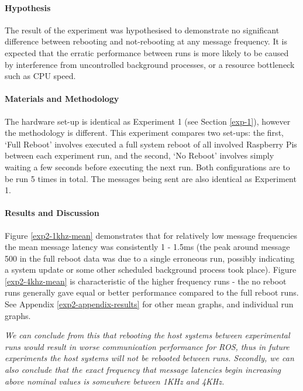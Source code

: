 \documentclass[../dissertation.tex]{subfiles}
\begin{document}
\paragraph{Hypothesis} The result of the experiment was hypothesised to demonstrate no significant difference between rebooting and not-rebooting at any message frequency. It is expected that the erratic performance between runs is more likely to be caused by interference from uncontrolled background processes, or a resource bottleneck such as CPU speed.

\paragraph{Materials and Methodology} The hardware set-up is identical as Experiment 1 (see Section \ref{exp-1}), however the methodology is different. This experiment compares two set-ups: the first, `Full Reboot' involves executed a full system reboot of all involved Raspberry Pis between each experiment run, and the second, `No Reboot' involves simply waiting a few seconds before executing the next run. Both configurations are to be run 5 times in total. The messages being sent are also identical as Experiment 1.

\paragraph{Results and Discussion} Figure \ref{exp2-1khz-mean} demonstrates that for relatively low message frequencies the mean message latency was consistently 1 - 1.5ms (the peak around message 500 in the full reboot data was due to a single erroneous run, possibly indicating a system update or some other scheduled background process took place). Figure \ref{exp2-4khz-mean} is characteristic of the higher frequency runs - the no reboot runs generally gave equal or better performance compared to the full reboot runs. See Appendix \ref{exp2-appendix-results} for other mean graphs, and individual run graphs.

\textit{We can conclude from this that rebooting the host systems between experimental runs would result in worse communication performance for ROS, thus in future experiments the host systems will not be rebooted between runs. Secondly, we can also conclude that the exact frequency that message latencies begin increasing above nominal values is somewhere between 1KHz and 4KHz.}
\end{document}
